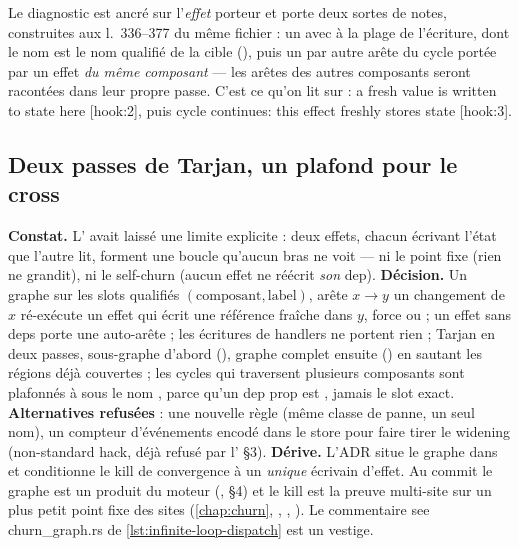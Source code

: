 Le diagnostic est ancré sur l'\emph{effet} porteur et porte deux sortes de notes, construites aux l.~336--377 du même fichier : un  avec  à la plage de l'écriture, dont le nom est le nom qualifié de la cible (), puis un  par autre arête du cycle portée par un effet \emph{du même composant} --- les arêtes des autres composants seront racontées dans leur propre passe. C'est ce qu'on lit sur  : \og a fresh value is written to state  here [hook:2]\fg, puis \og cycle continues: this effect freshly stores state  [hook:3]\fg.

\subsection{Deux passes de Tarjan, un plafond pour le cross}

\begin{decision}
\textbf{Constat.} L' avait laissé une limite explicite : deux effets, chacun écrivant l'état que l'autre lit, forment une boucle qu'aucun bras ne voit --- ni le point fixe (rien ne grandit), ni le self-churn (aucun effet ne réécrit \emph{son} dep).
\textbf{Décision.} Un graphe sur les slots qualifiés $(\text{composant}, \text{label})$, arête $x \to y$ \og un changement de $x$ ré-exécute un effet qui écrit une référence fraîche dans $y$\fg, force  ou  ; un effet sans deps porte une auto-arête ; les écritures de handlers ne portent rien ; Tarjan en deux passes, sous-graphe  d'abord (\Error), graphe complet ensuite (\Warning) en sautant les régions déjà couvertes ; les cycles qui traversent plusieurs composants sont plafonnés à \Warning{} sous le nom , parce qu'un dep prop est , jamais le slot exact. \textbf{Alternatives refusées} : une nouvelle règle (même classe de panne, un seul nom), un compteur d'événements encodé dans le store pour faire tirer le widening (\og non-standard hack\fg, déjà refusé par l' §3).
\textbf{Dérive.} L'ADR situe le graphe dans  et conditionne le kill de convergence à un \emph{unique} écrivain d'effet. Au commit \snapshotCommit{} le graphe est un produit du moteur (,  §4) et le kill est la preuve multi-site sur un plus petit point fixe des sites (\cref{chap:churn}, , , ). Le commentaire \og see churn\_graph.rs\fg{} de \cref{lst:infinite-loop-dispatch} est un vestige.
\end{decision}

